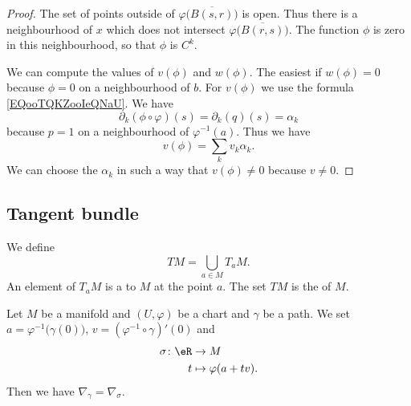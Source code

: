 \begin{proof}
    The set of points outside of \( \varphi\big( \overline{ B(s,r) } \big)\) is open. Thus there is a neighbourhood of \( x\) which does not intersect \( \varphi\big( \overline{ B(r,s) } \big)\). The function \( \phi\) is zero in this neighbourhood, so that \( \phi\) is \(  C^k\).

    We can compute the values of \( v(\phi)\) and \( w(\phi)\). The easiest if \( w(\phi)=0\) because \( \phi=0\) on a neighbourhood of \( b\). For \( v(\phi)\) we use the formula \ref{EQooTQKZooIeQNaU}. We have
    \begin{equation}
        \partial_k(\phi\circ\varphi)(s)=\partial_k(q)(s)=\alpha_k
    \end{equation}
    because \( p=1\) on a neighbourhood of \( \varphi^{-1}(a)\). Thus we have
    \begin{equation}
        v(\phi)=\sum_kv_k\alpha_k.
    \end{equation}
    We can choose the \( \alpha_k\) in such a way that \( v(\phi)\neq 0\) because \( v\neq 0\).
\end{proof}

\subsection{Tangent bundle}

\begin{definition}      \label{DEFooJJVIooDUBwDJ}
    We define
    \begin{equation}        \label{EQooJDFJooWmSLwp}
        TM=\bigcup_{a\in M}T_aM.
    \end{equation}
    An element of \( T_aM\) is a  to \( M\) at the point \( a\). The set \( TM\) is the  of \( M\).
\end{definition}

\begin{lemma}       \label{LEMooXFNQooXwCMNB}
    Let \( M\) be a manifold and \( (U,\varphi)\) be a chart and \( \gamma\) be a path. We set \( a=\varphi^{-1}\big( \gamma(0) \big)\), \(v= (\varphi^{-1}\circ\gamma)'(0)\) and
    \begin{equation}
        \begin{aligned}
            \sigma\colon \eR&\to M \\
            t&\mapsto \varphi(a+tv). 
        \end{aligned}
    \end{equation}
    Then we have \( \nabla_{\gamma}=\nabla_{\sigma}\).   
\end{lemma}

